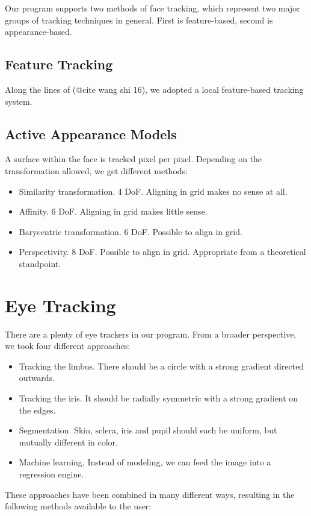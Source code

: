 Our program supports two methods of face tracking, which represent two major groups of tracking techniques in general.
First is feature-based, second is appearance-based.

\subsection{Feature Tracking}
Along the lines of (@cite wang shi 16), we adopted a local feature-based tracking system.

\subsection{Active Appearance Models}

A surface within the face is tracked pixel per pixel.
Depending on the transformation allowed, we get different methods:

\begin{itemize}
\item Similarity transformation. 4 DoF. Aligning in grid makes no sense at all.
\item Affinity. 6 DoF. Aligning in grid makes little sense.
\item Barycentric transformation. 6 DoF. Possible to align in grid.
\item Perspectivity. 8 DoF. Possible to align in grid. Appropriate from a theoretical standpoint.
\end{itemize}

\section{Eye Tracking}

There are a plenty of eye trackers in our program.
From a broader perspective, we took four different approaches:
\begin{itemize}
\item Tracking the limbus. There should be a circle with a strong gradient directed outwards.
\item Tracking the iris. It should be radially symmetric with a strong gradient on the edges.
\item Segmentation. Skin, sclera, iris and pupil should each be uniform, but mutually different in color.
\item Machine learning. Instead of modeling, we can feed the image into a regression engine.
\end{itemize}

These approaches have been combined in many different ways, resulting in the following methods available to the user:

